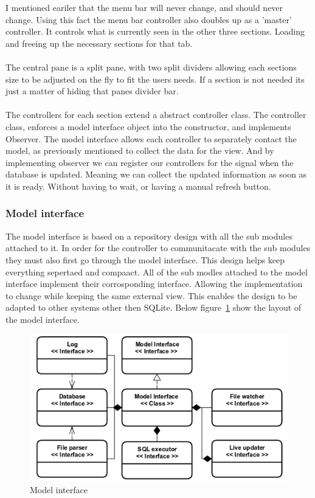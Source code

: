 I mentioned eariler that the menu bar will never change, and should never change. Using this fact the menu bar controller also doubles up as a 'master' controller. It controls what is currently seen in the other three sections. Loading and freeing up the necessary sections for that tab. 
\\\\
The central pane is a split pane, with two split dividers allowing each sections size to be adjusted on the fly to fit the users needs. If a section is not needed its just a matter of hiding that panes divider bar. 
\\\\
The controllers for each section extend a abstract controller class. The controller class, enforces a model interface object into the constructor, and implements Observer. The model interface allows each controller to separately contact the model, as previously mentioned to collect the data for the view. And by implementing observer we can register our controllers for the signal when the database is updated. Meaning we can collect the updated information as soon as it is ready. Without having to wait, or having a manual refresh button.    

\subsubsection{Model interface}
\label{subsubsec:imp_model_interface}

The model interface is based on a repository design with all the sub modules attached to it. In order for the controller to communitacate with the sub modules they must also first go through the model interface. This design helps keep everything sepertaed and compaact. All of the sub modles attached to the model interface implement their corrosponding interface. Allowing the implementation to change while keeping the same external view. This enables the design to be adapted to other systems other then SQLite. Below figure~\ref{fig:model_interface_design} show the layout of the model interface.

\begin{figure}[H]
	\centering
	\includegraphics[scale=0.3]{images/model_interface_design.png}
	\caption{Model interface}
	\label{fig:model_interface_design}
\end{figure}

